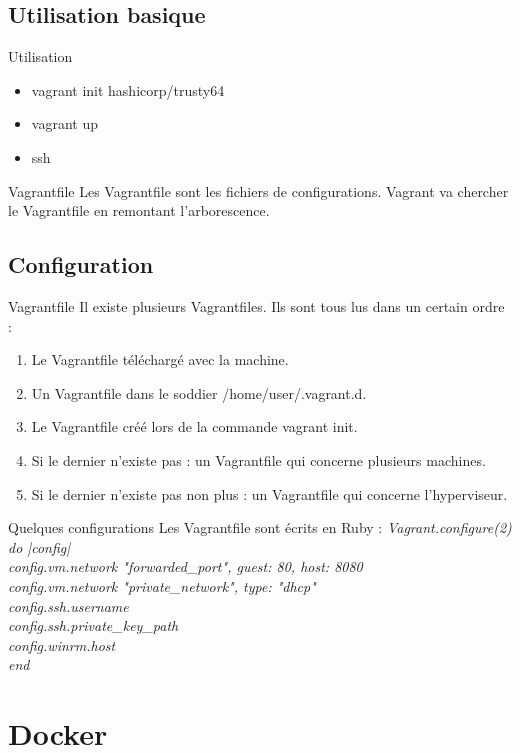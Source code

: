 \documentclass{beamer}
\begin{document}
    \subsection{Utilisation basique}
    \begin{frame}{Utilisation}
        \begin{itemize}
            \item{vagrant init hashicorp/trusty64}
            \item{vagrant up}
            \item{ssh}
        \end{itemize}
        \pause{}
        \begin{block}{Vagrantfile}
            Les Vagrantfile sont les fichiers de configurations. Vagrant va chercher le Vagrantfile en remontant l'arborescence.
        \end{block}
    \end{frame}
    
    \subsection{Configuration}
    \begin{frame}{Vagrantfile}
        Il existe plusieurs Vagrantfiles. Ils sont tous lus dans un certain ordre :
        \begin{enumerate}
            \item{Le Vagrantfile téléchargé avec la machine.}
            \item{Un Vagrantfile dans le soddier /home/user/.vagrant.d.}
            \item{Le Vagrantfile créé lors de la commande vagrant init.}
            \item{Si le dernier n'existe pas : un Vagrantfile qui concerne plusieurs machines.}
            \item{Si le dernier n'existe pas non plus : un Vagrantfile qui concerne l'hyperviseur.}
        \end{enumerate}
    \end{frame}
    
    \begin{frame}{Quelques configurations}
        Les Vagrantfile sont écrits en Ruby :\newline{}
        \em{Vagrant.configure(2) do |config| \\
                config.vm.network "forwarded\_port", guest: 80, host: 8080\\
                config.vm.network "private\_network", type: "dhcp"\\
                config.ssh.username\\
                config.ssh.private\_key\_path\\
                config.winrm.host\\
            end}
    \end{frame}
    \section{Docker}
\end{document}
